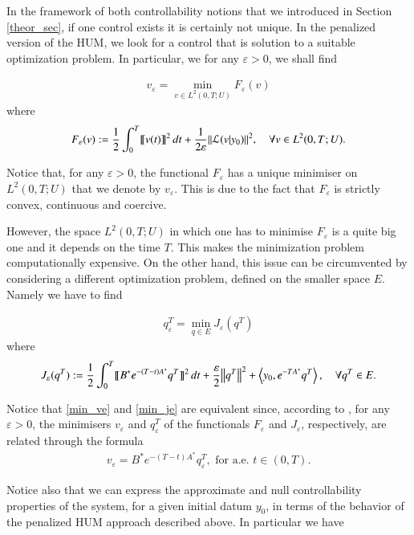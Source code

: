 In the framework of both controllability notions that we introduced in Section \ref{theor_sec}, if one control exists it is certainly not unique. In the penalized version of the HUM, we look for a control that is solution to a suitable optimization problem. In particular, we for any $\varepsilon>0$, we shall find

\begin{align}\label{min_ve}
	v_\varepsilon=\min_{v\in L^2(0,T;U)} F_\varepsilon (v)
\end{align}
where
\begin{align*}
	F_\varepsilon(v):=\frac{1}{2}\int_0^T\llbracket v(t)\rrbracket^2\,dt+\frac{1}{2\varepsilon}{\left\|\mathcal L(v|y_0)\right\|}_{}^2, \quad \forall v\in L^2(0,T;U).
\end{align*}

Notice that, for any $\varepsilon > 0$, the functional $F_\varepsilon$ has a unique minimiser on $L^2(0,T;U)$  that we denote by $v_\varepsilon$. This is due to the fact that $F_\varepsilon$ is strictly convex, continuous and coercive. 

However, the space $L^2(0,T;U)$ in which one has to minimise $F_\varepsilon$ is a quite big one and it depends on the time $T$. This makes the minimization problem computationally expensive. On the other hand, this issue can be circumvented by considering a different optimization problem, defined on the smaller space $E$. Namely we have to find  

\begin{align}\label{min_je}
	q^T_\varepsilon=\min_{q\in E} J_\varepsilon (q^T)
\end{align}
where
\begin{align}\label{penalized_fun}
	J_\varepsilon(q^T):=\frac{1}{2}\int_0^T\llbracket B^*e^{-(T-t)A^*}q^T\rrbracket^2\,dt+\frac{\varepsilon}{2}{\left\|q^T\right\|}_{}^2 + \left\langle y_0,e^{-TA^*}q^T\right\rangle, \quad \forall q^T\in E.
\end{align}

Notice that \eqref{min_ve} and \eqref{min_je} are equivalent since, according to \cite[Proposition 1.5]{boyer2013penalised}, for any $\varepsilon > 0$, the minimisers $v_\varepsilon$ and $q_\varepsilon^T$ of the functionals $F_\varepsilon$ and $J_\varepsilon$, respectively, are related through the formula
\begin{align*}
	v_\varepsilon = B^*e^{-(T-t)A^*}q_\varepsilon^T, \textrm{ for a.e. } t\in(0,T).
\end{align*} 

Notice also that we can express the approximate and null controllability properties of the system, for a given initial datum $y_0$, in terms of the behavior of the penalized HUM approach described above. In particular we have 

